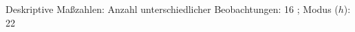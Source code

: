 				\label{tableValues:bfec152h_g3r}
				\vspace*{-\baselineskip}
                    \begin{noten}
                	    \note{} Deskriptive Maßzahlen:
                	    Anzahl unterschiedlicher Beobachtungen: 16%
                	    ; 
                	      Modus ($h$): 22
                     \end{noten}

